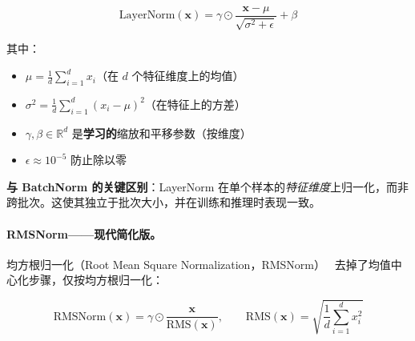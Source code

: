 \begin{equation}
\text{LayerNorm}(\mathbf{x}) = \gamma \odot \frac{\mathbf{x} - \mu}{\sqrt{\sigma^2 + \epsilon}} + \beta
\end{equation}

其中：

\begin{itemize}
  \item $\mu = \frac{1}{d}\sum_{i=1}^{d} x_i$（在 $d$ 个特征维度上的均值）
  \item $\sigma^2 = \frac{1}{d}\sum_{i=1}^{d} (x_i - \mu)^2$（在特征上的方差）
  \item $\gamma, \beta \in \mathbb{R}^d$ 是\textbf{学习的}缩放和平移参数（按维度）
  \item $\epsilon \approx 10^{-5}$ 防止除以零
\end{itemize}

\textbf{与 BatchNorm 的关键区别}：LayerNorm 在单个样本的\emph{特征维度}上归一化，而非跨批次。这使其独立于批次大小，并在训练和推理时表现一致。

\paragraph{RMSNorm——现代简化版。}
\label{rmsnorm-the-modern-simplification.}

均方根归一化（Root Mean Square Normalization，RMSNorm）~\cite{zhang2019rmsnorm} 去掉了均值中心化步骤，仅按均方根归一化：

\begin{equation}
\text{RMSNorm}(\mathbf{x}) = \gamma \odot \frac{\mathbf{x}}{\text{RMS}(\mathbf{x})}, \qquad \text{RMS}(\mathbf{x}) = \sqrt{\frac{1}{d}\sum_{i=1}^{d} x_i^2}
\end{equation}

